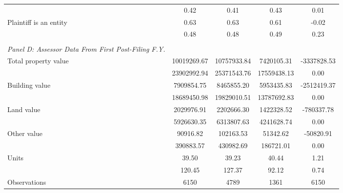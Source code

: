 \begin{table}[htbp]
\begin{tabular}{l*{4}{c}}
                    &       0.42 &       0.41 &       0.43 &        0.01\\
\hspace{0.25cm}Plaintiff is an entity&       0.63 &       0.63 &       0.61 &       -0.02\\
                    &       0.48 &       0.48 &       0.49 &        0.23\\
\vspace{0.1em} \\ \emph{Panel D: Assessor Data From First Post-Filing F.Y.}&            &            &            &            \\
\hspace{0.25cm}Total property value&10019269.67 &10757933.84 & 7420105.31 & -3337828.53\\
                    &23902992.94 &25371543.76 &17559438.13 &        0.00\\
\hspace{0.25cm}Building value& 7909854.75 & 8465855.20 & 5953435.83 & -2512419.37\\
                    &18689450.98 &19829010.51 &13787692.83 &        0.00\\
\hspace{0.25cm}Land value& 2029976.91 & 2202666.30 & 1422328.52 &  -780337.78\\
                    & 5926630.35 & 6313807.63 & 4241628.74 &        0.00\\
\hspace{0.25cm}Other value&   90916.82 &  102163.53 &   51342.62 &   -50820.91\\
                    &  390883.57 &  430982.69 &  186721.01 &        0.00\\
\hspace{0.25cm}Units&      39.50 &      39.23 &      40.44 &        1.21\\
                    &     120.45 &     127.37 &      92.12 &        0.74\\
\midrule
Observations        &        6150&        4789&        1361&        6150\\
\bottomrule
\end{tabular}
\end{table}
